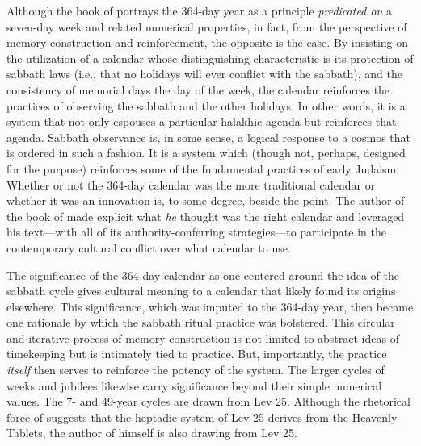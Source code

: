 Although the book of \jub portrays the 364-day year as a principle \emph{predicated on} a seven-day week and related numerical properties, in fact, from the perspective of memory construction and reinforcement, the opposite is the case. By insisting on the utilization of a calendar whose distinguishing characteristic is its protection of sabbath laws (i.e., that no holidays will ever conflict with the sabbath), and the consistency of memorial days \visavis the day of the week, the calendar reinforces the practices of observing the sabbath and the other holidays. In other words, it is a system that not only espouses a particular halakhic agenda but reinforces that agenda. Sabbath observance is, in some sense, a logical response to a cosmos that is ordered in such a fashion. It is a system which (though not, perhaps, designed for the purpose) reinforces some of the fundamental practices of early Judaism. Whether or not the 364-day calendar was the more traditional calendar or whether it was an innovation is, to some degree, beside the point. The author of the book of \jub made explicit what \emph{he} thought was the right calendar and leveraged his text---with all of its authority-conferring strategies---to participate in the contemporary cultural conflict over what calendar to use. 

The significance of the 364-day calendar as one centered around the idea of the sabbath cycle gives cultural meaning to a calendar that likely found its origins elsewhere. This significance, which was imputed to the 364-day year, then became one rationale by which the sabbath ritual practice was bolstered.%
    \autocite{fraade_dine-israel2010}
This circular and iterative process of memory construction is not limited to abstract ideas of timekeeping but is intimately tied to practice. But, importantly, the practice \emph{itself} then serves to reinforce the potency of the system. 
The larger cycles of weeks and jubilees likewise carry significance beyond their simple numerical values. The 7- and 49-year cycles are drawn from Lev 25. Although the rhetorical force of \jub suggests that the heptadic system of Lev 25 derives from the Heavenly Tablets, the author of \jub himself is also drawing from Lev 25. 


